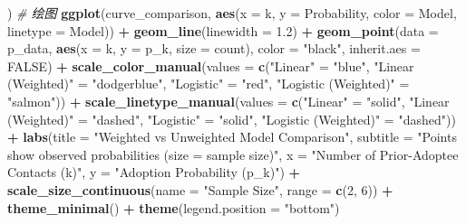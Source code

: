 \documentclass[
]{article}
\newenvironment{Shaded}{\begin{snugshade}}{\end{snugshade}}
\newcommand{\AttributeTok}[1]{\textcolor[rgb]{0.13,0.29,0.53}{#1}}
\newcommand{\CommentTok}[1]{\textcolor[rgb]{0.56,0.35,0.01}{\textit{#1}}}
\newcommand{\ConstantTok}[1]{\textcolor[rgb]{0.56,0.35,0.01}{#1}}
\newcommand{\DecValTok}[1]{\textcolor[rgb]{0.00,0.00,0.81}{#1}}
\newcommand{\FloatTok}[1]{\textcolor[rgb]{0.00,0.00,0.81}{#1}}
\newcommand{\FunctionTok}[1]{\textcolor[rgb]{0.13,0.29,0.53}{\textbf{#1}}}
\newcommand{\NormalTok}[1]{#1}
\newcommand{\OtherTok}[1]{\textcolor[rgb]{0.56,0.35,0.01}{#1}}
\newcommand{\SpecialCharTok}[1]{\textcolor[rgb]{0.81,0.36,0.00}{\textbf{#1}}}
\newcommand{\StringTok}[1]{\textcolor[rgb]{0.31,0.60,0.02}{#1}}
\begin{document}
\begin{Shaded}
\begin{Highlighting}[]
\NormalTok{)}
\CommentTok{\# 绘图}
\FunctionTok{ggplot}\NormalTok{(curve\_comparison, }\FunctionTok{aes}\NormalTok{(}\AttributeTok{x =}\NormalTok{ k, }\AttributeTok{y =}\NormalTok{ Probability, }\AttributeTok{color =}\NormalTok{ Model, }\AttributeTok{linetype =}\NormalTok{ Model)) }\SpecialCharTok{+}
\FunctionTok{geom\_line}\NormalTok{(}\AttributeTok{linewidth =} \FloatTok{1.2}\NormalTok{) }\SpecialCharTok{+}
\FunctionTok{geom\_point}\NormalTok{(}\AttributeTok{data =}\NormalTok{ p\_data, }\FunctionTok{aes}\NormalTok{(}\AttributeTok{x =}\NormalTok{ k, }\AttributeTok{y =}\NormalTok{ p\_k, }\AttributeTok{size =}\NormalTok{ count),}
\AttributeTok{color =} \StringTok{"black"}\NormalTok{, }\AttributeTok{inherit.aes =} \ConstantTok{FALSE}\NormalTok{) }\SpecialCharTok{+}
\FunctionTok{scale\_color\_manual}\NormalTok{(}\AttributeTok{values =} \FunctionTok{c}\NormalTok{(}\StringTok{"Linear"} \OtherTok{=} \StringTok{"blue"}\NormalTok{, }\StringTok{"Linear (Weighted)"} \OtherTok{=} \StringTok{"dodgerblue"}\NormalTok{,}
\StringTok{"Logistic"} \OtherTok{=} \StringTok{"red"}\NormalTok{, }\StringTok{"Logistic (Weighted)"} \OtherTok{=} \StringTok{"salmon"}\NormalTok{)) }\SpecialCharTok{+}
\FunctionTok{scale\_linetype\_manual}\NormalTok{(}\AttributeTok{values =} \FunctionTok{c}\NormalTok{(}\StringTok{"Linear"} \OtherTok{=} \StringTok{"solid"}\NormalTok{, }\StringTok{"Linear (Weighted)"} \OtherTok{=} \StringTok{"dashed"}\NormalTok{,}
\StringTok{"Logistic"} \OtherTok{=} \StringTok{"solid"}\NormalTok{, }\StringTok{"Logistic (Weighted)"} \OtherTok{=} \StringTok{"dashed"}\NormalTok{)) }\SpecialCharTok{+}
\FunctionTok{labs}\NormalTok{(}\AttributeTok{title =} \StringTok{"Weighted vs Unweighted Model Comparison"}\NormalTok{,}
\AttributeTok{subtitle =} \StringTok{"Points show observed probabilities (size = sample size)"}\NormalTok{,}
\AttributeTok{x =} \StringTok{"Number of Prior{-}Adoptee Contacts (k)"}\NormalTok{,}
\AttributeTok{y =} \StringTok{"Adoption Probability (p\_k)"}\NormalTok{) }\SpecialCharTok{+}
\FunctionTok{scale\_size\_continuous}\NormalTok{(}\AttributeTok{name =} \StringTok{"Sample Size"}\NormalTok{, }\AttributeTok{range =} \FunctionTok{c}\NormalTok{(}\DecValTok{2}\NormalTok{, }\DecValTok{6}\NormalTok{)) }\SpecialCharTok{+}
\FunctionTok{theme\_minimal}\NormalTok{() }\SpecialCharTok{+}
\FunctionTok{theme}\NormalTok{(}\AttributeTok{legend.position =} \StringTok{"bottom"}\NormalTok{)}
\end{Highlighting}
\end{Shaded}
\end{document}
